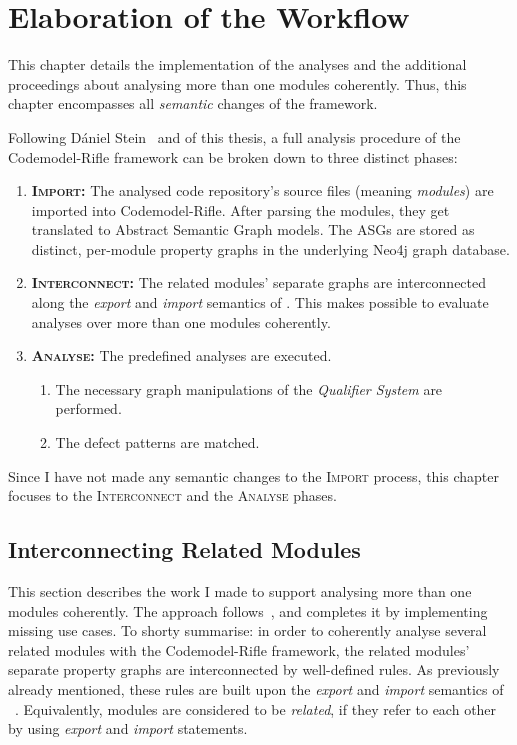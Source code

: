 \chapter{Elaboration of the Workflow}
\label{chapter:elaboration}

This chapter details the implementation of the analyses and the additional proceedings about analysing more than one \es modules coherently. Thus, this chapter encompasses all \emph{semantic} changes of the framework.

Following Dániel Stein~\cite{stein-daniel-msc} and  of this thesis, a full analysis procedure of the Codemodel-Rifle framework can be broken down to three distinct phases:

\begin{enumerate}
\item \textsc{\textbf{Import:}} The analysed code repository's \es source files (meaning \es \emph{modules}) are imported into Codemodel-Rifle. After parsing the modules, they get translated to Abstract Semantic Graph models. The ASGs are stored as distinct, per-module property graphs in the underlying Neo4j graph database.
\item \textsc{\textbf{Interconnect:}} The related modules' separate graphs are interconnected along the \emph{export} and \emph{import} semantics of \es. This makes possible to evaluate analyses over more than one modules coherently.
\item \textsc{\textbf{Analyse:}} The predefined analyses are executed.
	\begin{enumerate}
	\item The necessary graph manipulations of the \emph{Qualifier System} are performed.
	\item The defect patterns are matched.
	\end{enumerate}
\end{enumerate}

Since I have not made any semantic changes to the \textsc{Import} process, this chapter focuses to the \textsc{Interconnect} and the \textsc{Analyse} phases.


\section{Interconnecting Related \es Modules}

This section describes the work I made to support analysing more than one \es modules coherently. The approach follows~\cite{stein-daniel-msc}, and completes it by implementing missing use cases. To shorty summarise: in order to coherently analyse several related \es modules with the Codemodel-Rifle framework, the related modules' separate property graphs are interconnected by well-defined rules. As previously already mentioned, these rules are built upon the \emph{export} and \emph{import} semantics of \es~\cite{exploringes6}. Equivalently, \es modules are considered to be \emph{related}, if they refer to each other by using \emph{export} and \emph{import} statements.


